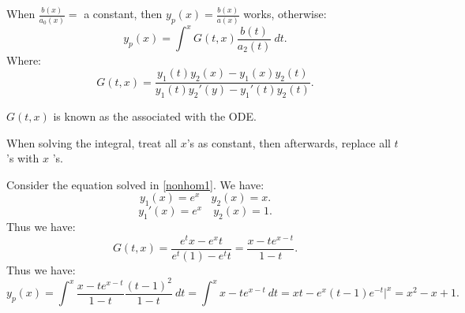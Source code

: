 \documentclass[../main/main.tex]{subfiles}
\begin{document}
When $\frac{b(x)}{a_0(x)}=$ a  constant, then $y_p(x)=\frac{b(x)}{a(x)}$ works, otherwise: \[
	y_p(x) = \int^x G(t,x) \frac{b(t)}{a_2(t)}~dt
.\] Where: \[
G(t,x) = \frac{y_1(t)y_2(x)-y_1(x)y_2(t)}{y_1(t)y_2'(y)-y_1'(t)y_2(t)}
.\] 
\begin{remark}
	$G(t,x)$ is known as the  associated with the ODE.
\end{remark}
\begin{remark}
	When solving the integral, treat all $x$'s as constant, then afterwards, replace all $t$ 's with $x$ 's.
\end{remark}
\begin{example}
	Consider the equation solved in \ref{nonhom1}. We have: \[
		y_1(x)=e^{x}\quad y_2(x) = x
	.\] 	\[
	y_1'(x) = e^{x} \quad y_2(x)= 1
	.\] Thus we have: \[
	G(t,x) = \frac{e^{t}x-e^{x}t}{e^{t}(1)-e^{t}t} = \frac{x-te^{x-t}}{1-t}
	.\] Thus we have: \[
	y_p(x) = \int^x \frac{x-t e^{x-t}}{1-t} \frac{(t-1)^2}{1-t}~dt = \int^x x-t e^{x-t}~dt = xt -e^{x}(t-1)e^{-t}\bigg\rvert^x = x^2-x+1
	.\] 
\end{example}
\end{document}
